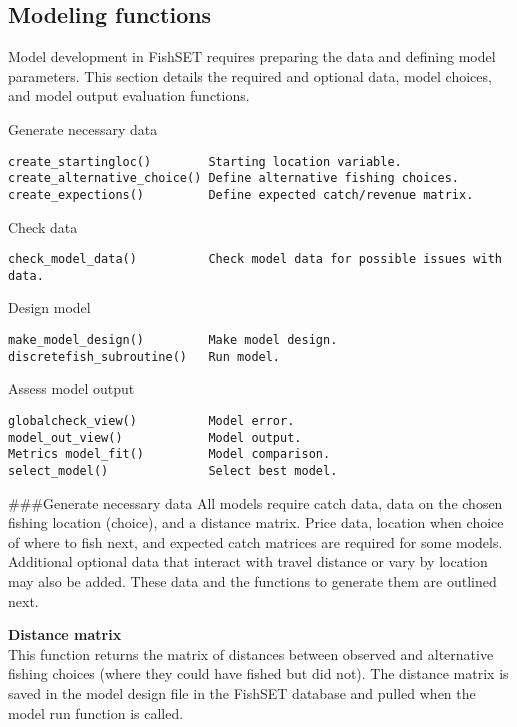 \documentclass[
]{article}
\begin{document}
\hypertarget{modeling-functions-1}{%
\subsection{Modeling functions}\label{modeling-functions-1}}

Model development in FishSET requires preparing the data and defining model parameters. This section details the required and optional data, model choices, and model output evaluation functions.

Generate necessary data

\begin{verbatim}
create_startingloc()        Starting location variable.         
create_alternative_choice() Define alternative fishing choices.   
create_expections()         Define expected catch/revenue matrix.   
\end{verbatim}

Check data

\begin{verbatim}
check_model_data()          Check model data for possible issues with data.
\end{verbatim}

Design model

\begin{verbatim}
make_model_design()         Make model design.                      
discretefish_subroutine()   Run model.                              
\end{verbatim}

Assess model output

\begin{verbatim}
globalcheck_view()          Model error.
model_out_view()            Model output.   
Metrics model_fit()         Model comparison.
select_model()              Select best model.  
\end{verbatim}

\#\#\#Generate necessary data
All models require catch data, data on the chosen fishing location (choice), and a distance matrix. Price data, location when choice of where to fish next, and expected catch matrices are required for some models. Additional optional data that interact with travel distance or vary by location may also be added. These data and the functions to generate them are outlined next.

\textbf{Distance matrix}\\
This function returns the matrix of distances between observed and alternative fishing choices (where they could have fished but did not). The distance matrix is saved in the model design file in the FishSET database and pulled when the model run function is called.
\end{document}
